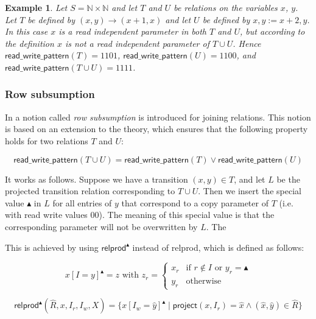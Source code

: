 \documentclass{article}
\newtheorem{example}[theorem]{Example}
\begin{document}
\begin{example}
Let $S = \mathbb{N} \times \mathbb{N}$ and let $T$ and $U$ be relations on the variables $x$, $y$. Let $T$ be defined by 
$(x,y) \rightarrow (x + 1, x)$
and let $U$ be defined by
$x, y := x + 2, y$.
In this case $x$ is a read independent parameter in both $T$ and $U$, but according to the definition $x$ is not a read independent parameter of 
$T \cup U$.
Hence $\textsf{read\_write\_pattern}(T) = 1101$,
$\textsf{read\_write\_pattern}(U) = 1100$, and
$\textsf{read\_write\_pattern}(T \cup U) = 1111$. 
\end{example}

\subsubsection{Row subsumption}
In \cite{Meijer2019} a notion called \emph{row subsumption} is
introduced for joining relations. This notion is based on an extension to the theory, which ensures that the following property holds for two relations $T$ and $U$:

\begin{equation} \label{bitwise_or}
\textsf{read\_write\_pattern}(T \cup U) = \textsf{read\_write\_pattern}(T) \lor \textsf{read\_write\_pattern}(U)
\end{equation}

\noindent
It works as follows. Suppose we have a transition $(x, y) \in T$, and let $L$ be the projected transition relation corresponding to $T \cup U$. Then we insert the special value $\blacktriangle$ in $L$ for all entries of $y$ that correspond to a copy parameter of $T$ (i.e. with read write values 00). The meaning of this special value is that the corresponding parameter will not be overwritten by $L$. The 

This is achieved by using
$\textsf{relprod}^\blacktriangle$ instead of \textsf{relprod}, which is
defined as follows:

\[
x[I = y]^\blacktriangle = z \text{ with } z_r = 
  \left\{
    \begin{array}{ll}
         x_r & \text{if } r \notin I \text{ or } y_r = \blacktriangle \\
         y_r & \text{otherwise}
    \end{array}
  \right. 
\]

\[
    \textsf{relprod}^\blacktriangle(\hat{R}, x, I_r, I_w, X) =
        \{ 
          x[I_w = \hat{y}]^\blacktriangle \mid \textsf{project}(x, I_r) = \hat{x} \land 
          (\hat{x}, \hat{y}) \in \hat{R}
        \}
\]
\end{document}
